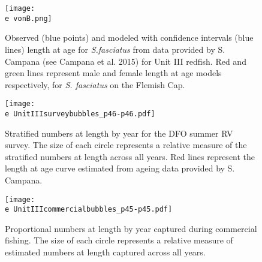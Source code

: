 \documentclass[11pt]{article}
\newcommand{\e}{/home/ecomod_data/redfish/figures/}
\begin{document}
\begin{figure}
\centering
    
    \texttt{[image: \\e vonB.png]}
    \caption{Observed (blue points) and modeled with confidence intervals (blue lines) length at age for \emph{S.fasciatus} from data provided by S. Campana (see Campana et al. 2015) for Unit III redfish. Red and green lines represent male and female length at age models respectively, for \emph{S. fasciatus} on the Flemish Cap.}

\end{figure}



\clearpage



\begin{landscape}
\begin{figure}
\centering
    
    \texttt{[image: \\e UnitIIIsurveybubbles\_p46-p46.pdf]}
    \caption{Stratified numbers at length by year for the DFO summer RV survey. The size of each circle represents a relative measure of the stratified numbers at length across all years. Red lines represent the length at age curve estimated from ageing data provided by S. Campana.}

\end{figure}
\clearpage


\begin{figure}
\centering
    
    \texttt{[image: \\e UnitIIIcommercialbubbles\_p45-p45.pdf]}
    \caption{Proportional numbers at length by year captured during commercial fishing. The size of each circle represents a relative measure of estimated numbers at length captured across all years. }

\end{figure}
\clearpage
\end{landscape}
\end{document}
